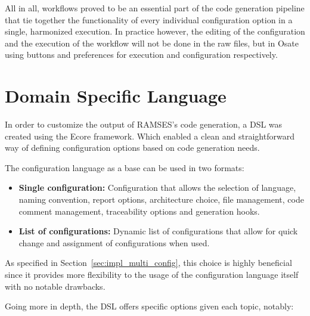All in all, workflows proved to be an essential part of the code generation pipeline that tie together the functionality of every individual configuration option in a single, harmonized execution. In practice however, the editing of the configuration and the execution of the workflow will not be done in the raw files, but in \gls{Osate} using buttons and preferences for execution and configuration respectively.




\section{Domain Specific Language}
\label{sec:dsl}

In order to customize the output of \gls{RAMSES}'s code generation, a \gls{DSL} was created using the Ecore framework. Which enabled a clean and straightforward way of defining configuration options based on code generation needs.

The configuration language as a base can be used in two formats:

\begin{itemize}  
	\item \textbf{Single configuration: } Configuration that allows the selection of language, naming convention, report options, architecture choice, file management, code comment management, traceability options and generation hooks.
	\item \textbf{List of configurations: } Dynamic list of configurations that allow for quick change and assignment of configurations when used.
\end{itemize}


As specified in Section~\ref{sec:impl_multi_config}, this choice is highly beneficial since it provides more flexibility to the usage of the configuration language itself with no notable drawbacks.

Going more in depth, the \gls{DSL} offers specific options given each topic, notably:

